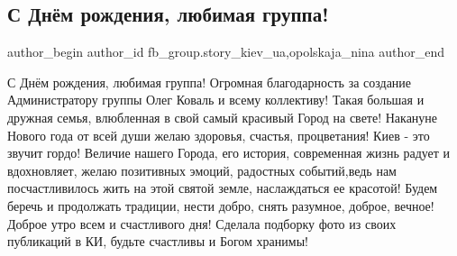  
 
 
 
 

\subsection{С Днём рождения, любимая группа!}
\label{sec:24_12_2021.fb.fb_group.story_kiev_ua.5.s_dnem_rozhdenia_ljubimaja_gruppa}
 
\ifcmt
 author_begin
   author_id fb_group.story_kiev_ua,opolskaja_nina
 author_end
\fi

С Днём рождения, любимая группа! Огромная благодарность за создание
Администратору группы Олег Коваль и всему коллективу! Такая большая и дружная
семья, влюбленная в свой самый красивый Город на свете! Накануне Нового года от
всей души желаю здоровья, счастья, процветания! Киев - это звучит гордо! Величие
нашего Города, его история, современная жизнь радует и вдохновляет, желаю
позитивных эмоций, радостных событий,ведь нам посчастливилось жить на этой
святой земле, наслаждаться ее красотой! Будем беречь и продолжать традиции, нести
добро, снять разумное, доброе, вечное! Доброе утро всем и счастливого дня! Сделала
подборку фото из своих публикаций в КИ, будьте счастливы и Богом хранимы!
